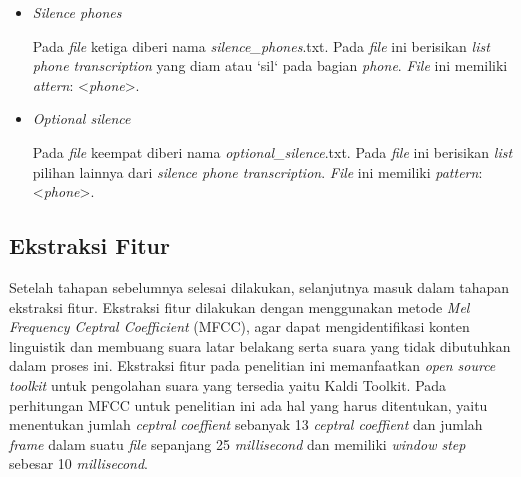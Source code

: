 \begin{enumerate}
\begin{itemize}
	\item \textit{Silence phones}
	\par Pada \textit{file} ketiga diberi nama \textit{silence\_phones}.txt. Pada \textit{file} ini berisikan \textit{list phone transcription} yang diam atau `sil` pada bagian \textit{phone}. \textit{File} ini memiliki \textit{attern}: <\textit{phone}>.
	
	\item \textit{Optional silence}
	\par Pada \textit{file} keempat diberi nama \textit{optional\_silence}.txt. Pada \textit{file} ini berisikan \textit{list} pilihan lainnya dari \textit{silence phone transcription}. \textit{File} ini memiliki \textit{pattern}: <\textit{phone}>.
	\end{itemize}

\end{enumerate}


\subsection{Ekstraksi Fitur}
Setelah tahapan sebelumnya selesai dilakukan, selanjutnya masuk dalam tahapan ekstraksi fitur. Ekstraksi fitur dilakukan dengan menggunakan metode \textit{Mel Frequency Ceptral Coefficient} (MFCC), agar dapat mengidentifikasi konten linguistik dan membuang suara latar belakang serta suara yang tidak dibutuhkan dalam proses ini. Ekstraksi fitur pada penelitian ini memanfaatkan \textit{open source toolkit} untuk pengolahan suara yang tersedia yaitu Kaldi Toolkit. Pada perhitungan MFCC untuk penelitian ini ada hal yang harus ditentukan, yaitu menentukan jumlah \textit{ceptral coeffient} sebanyak 13 \textit{ceptral coeffient} dan jumlah \textit{frame} dalam suatu \textit{file} sepanjang 25 \textit{millisecond} dan memiliki \textit{window step} sebesar 10 \textit{millisecond}.

